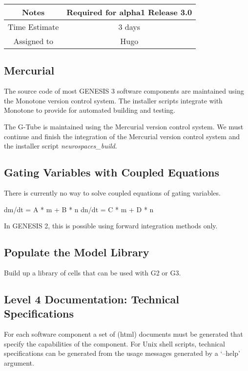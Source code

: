 \documentclass[12pt]{article}
\begin{document}
{
  \vspace{5mm}
  \centering
  \begin{tabular}{|c|c|}
    \hline
    Notes
    & Required for alpha1 Release 3.0 \\
    \hline
    Time Estimate
    & 3 days \\
    \hline
    Assigned to
    & Hugo \\
    \hline
  \end{tabular}
}


\subsection{Mercurial}

The source code of most GENESIS 3 software components are maintained
using the Monotone version control system.  The installer scripts
integrate with Monotone to provide for automated building and testing.

The G-Tube is maintained using the Mercurial version control system.
We must continue and finish the integration of the Mercurial version
control system and the installer script {\it neurospaces\_build}.


\subsection{Gating Variables with Coupled Equations}

There is currently no way to solve coupled equations of gating
variables.

dm/dt = A * m + B * n
dn/dt = C * m + D * n

In GENESIS 2, this is possible using forward integration methods only.


\subsection{Populate the Model Library}

Build up a library of cells that can be used with G2 or G3.


\subsection{Level 4 Documentation: Technical Specifications}

For each software component a set of (html) documents must be
generated that specify the capabilities of the component.  For Unix
shell scripts, technical specifications can be generated from the
usage messages generated by a `--help' argument.
\end{document}
